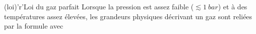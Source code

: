 \documentclass[../../main/main.tex]{subfiles}
\begin{document}
\begin{tcbraster}[raster columns=2, raster equal height=rows]
\begin{tcb}[label=def:gp]
\begin{minipage}{0.49\linewidth}
		\end{minipage}
	\end{tcb}
	\begin{tcb*}[label=loi:gp](loi)'r'{Loi du gaz parfait}
		Lorsque la pression est assez faible ($\lesssim \SI{1}{bar}$) et à des
		températures assez élevées, les grandeurs physiques décrivant un gaz
		sont reliées par la formule
		avec
		\vspace{-15pt}
	\end{tcb*}
\end{tcbraster}
\end{document}
